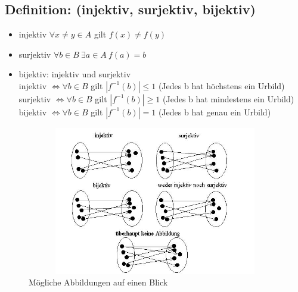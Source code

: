 \subsection{Definition: (injektiv, surjektiv, bijektiv)}
\begin{itemize}
	\item injektiv $\forall x \neq y \in A$ gilt $f(x)\neq f(y)$
	\item surjektiv $\forall b \in B ~ \exists a \in A ~ f(a)=b$
	\item bijektiv: injektiv und surjektiv\\
		injektiv $\Leftrightarrow \forall b\in B$ gilt $|f^{-1}(b)| \leq 1$ (Jedes b hat 
		höchstens ein Urbild)\\
		surjektiv $ \Leftrightarrow \forall b \in B$ gilt $|f^{-1}(b)| \geq 1$ (Jedes b hat 
		mindestens ein Urbild)\\
		bijektiv $\Leftrightarrow \forall b \in B$ gilt $|f^{-1}(b)| = 1$ (Jedes b hat genau 
		ein Urbild)
\end{itemize}
%
\begin{figure} [H]
	\centering 
	\includegraphics[width=12cm, height=6.5cm]{mainmatter/chapter0/pics/abbildungen.jpg}
	\caption{Mögliche Abbildungen auf einen Blick} 
\end{figure}
